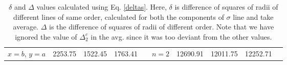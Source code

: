 \begin{table*}
\begin{ruledtabular}
\begin{tabular}{cccccccccc}
            $x=b$, $y=a$ & 2253.75 & 1522.45 & 1763.41 &  & $n=2$ & 12690.91 & 12011.75 & 12252.71 & \\
            \end{tabular}
        \caption{$\delta$ and $\Delta$ values calculated using Eq. \ref{deltas}. Here, $\delta$ is difference of squares of radii of different lines of same order, calculated for both the components of $\sigma$ line and take average. $\Delta$ is the difference of squares of radii of different order. Note that we have ignored the value of $\Delta^c_2$ in the avg. since it was too deviant from the other values.}
        \label{tab:2}
        \end{ruledtabular}
\end{table*}